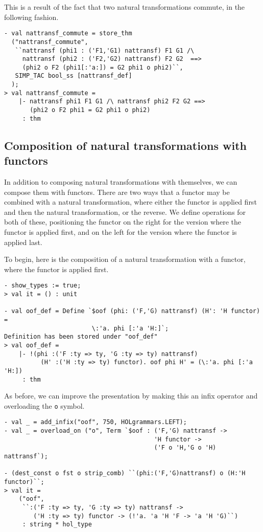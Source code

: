This is a result of the fact that two natural transformations commute,
in the following fashion.
\begin{session}
\begin{verbatim}
- val nattransf_commute = store_thm
  ("nattransf_commute",
   ``nattransf (phi1 : ('F1,'G1) nattransf) F1 G1 /\
     nattransf (phi2 : ('F2,'G2) nattransf) F2 G2  ==>
     (phi2 o F2 (phi1[:'a:]) = G2 phi1 o phi2)``,
   SIMP_TAC bool_ss [nattransf_def]
  );
> val nattransf_commute =
    |- nattransf phi1 F1 G1 /\ nattransf phi2 F2 G2 ==>
       (phi2 o F2 phi1 = G2 phi1 o phi2)
     : thm
\end{verbatim}
\end{session}

\subsection{Composition of natural transformations with functors}

In addition to composing natural transformations with themselves, we can
compose them with functors. There are two ways that a functor may be combined
with a natural transformation, where either the functor is applied first
and then the natural transformation, or the reverse. We define operations
for both of these, positioning the functor on the right for the version where
the functor is applied first, and on the left for the version where
the functor is applied last.

To begin, here is the composition of a natural transformation with a functor,
where the functor is applied first.
%
\begin{session}
\begin{verbatim}
- show_types := true;
> val it = () : unit

- val oof_def = Define `$oof (phi: ('F,'G) nattransf) (H': 'H functor) =
                        \:'a. phi [:'a 'H:]`;
Definition has been stored under "oof_def"
> val oof_def =
    |- !(phi :('F :ty => ty, 'G :ty => ty) nattransf)
          (H' :('H :ty => ty) functor). oof phi H' = (\:'a. phi [:'a 'H:])
     : thm
\end{verbatim}
\end{session}

As before, we can improve the presentation by making this an infix operator
and overloading the \texttt{o} symbol.
\begin{session}
\begin{verbatim}
- val _ = add_infix("oof", 750, HOLgrammars.LEFT);
- val _ = overload_on ("o", Term `$oof : ('F,'G) nattransf ->
                                         'H functor ->
                                         ('F o 'H,'G o 'H) nattransf`);

- (dest_const o fst o strip_comb) ``(phi:('F,'G)nattransf) o (H:'H functor)``;
> val it =
    ("oof",
     ``:('F :ty => ty, 'G :ty => ty) nattransf ->
        ('H :ty => ty) functor -> (!'a. 'a 'H 'F -> 'a 'H 'G)``)
     : string * hol_type
\end{verbatim}
\end{session}

